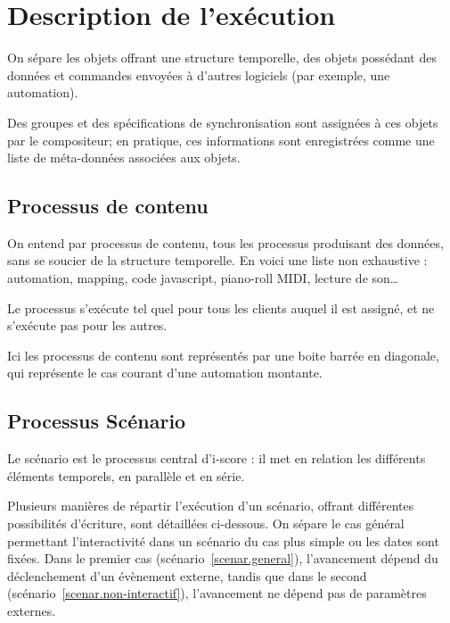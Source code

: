 \documentclass{article}
\begin{document}
\section{Description de l'exécution}\label{sec.description}
On sépare les objets offrant une structure temporelle, des objets possédant des données et commandes envoyées à d'autres logiciels (par exemple, une automation).

Des groupes et des spécifications de synchronisation sont assignées à ces objets par le compositeur; en pratique, ces informations sont enregistrées comme une liste de méta-données associées aux objets.

\subsection{Processus de contenu}
On entend par processus de contenu, tous les processus produisant des données, sans se soucier de la structure temporelle. 
En voici une liste non exhaustive : automation, mapping, code javascript, piano-roll MIDI, lecture de son\dots

Le processus s'exécute tel quel pour tous les clients auquel il est assigné, 
et ne s'exécute pas pour les autres.

Ici les processus de contenu sont représentés par une boite barrée en diagonale, qui représente le cas courant d'une automation montante.

\subsection{Processus Scénario}
Le scénario est le processus central d'i-score : il met en relation les différents éléments temporels, en parallèle et en série.

Plusieurs manières de répartir l'exécution d'un scénario, offrant différentes possibilités d'écriture, sont détaillées ci-dessous. 
On sépare le cas général permettant l'interactivité dans un scénario du cas plus simple ou les dates sont fixées.
Dans le premier cas (scénario~\ref{scenar.general}), l'avancement dépend du déclenchement d'un évènement externe, tandis que dans le second (scénario~\ref{scenar.non-interactif}), l'avancement ne dépend pas de paramètres externes. 
\end{document}
